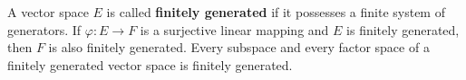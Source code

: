 A vector space $E$ is called \textbf{finitely generated} if it possesses a finite system of generators. If $\varphi: E \to F$ is a surjective linear mapping and $E$ is finitely generated, then $F$ is also finitely generated. Every subspace and every factor space of a finitely generated vector space is finitely generated.
